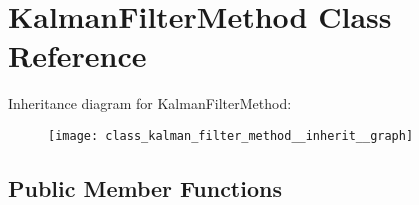 \hypertarget{class_kalman_filter_method}{\section{\-Kalman\-Filter\-Method \-Class \-Reference}
\label{class_kalman_filter_method}
}


\-Inheritance diagram for \-Kalman\-Filter\-Method\-:\nopagebreak
\begin{figure}[H]
\begin{center}
\leavevmode
\texttt{[image: class\_kalman\_filter\_method\_\_inherit\_\_graph]}
\end{center}
\end{figure}
\subsection*{\-Public \-Member \-Functions}
